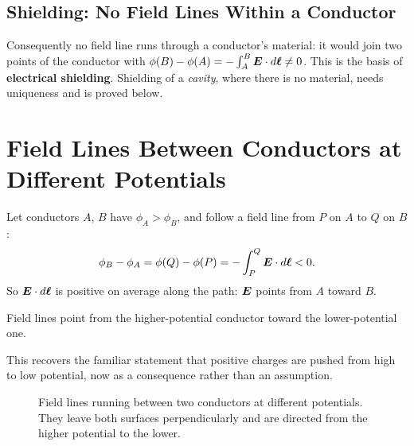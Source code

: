 \subsection{Shielding: No Field Lines Within a Conductor}
\label{sec:em-shielding}

Consequently no field line runs through a conductor's material: it would join two points of the conductor with $\phi(B)-\phi(A) = -\int_A^B\vect{E}\cdot d\vect{\ell}\neq 0$. This is the basis of \textbf{electrical shielding}. Shielding of a \emph{cavity}, where there is no material, needs uniqueness and is proved below.

\section{Field Lines Between Conductors at Different Potentials}

Let conductors $A$, $B$ have $\phi_A>\phi_B$, and follow a field line from $P$ on $A$ to $Q$ on $B$:
\[
    \phi_B - \phi_A = \phi(Q) - \phi(P) = -\int_P^Q \vect{E}\cdot d\vect{\ell} < 0 .
\]
So $\vect{E}\cdot d\vect{\ell}$ is positive on average along the path: $\vect{E}$ points from $A$ toward $B$.

\begin{fact}
Field lines point from the higher-potential conductor toward the lower-potential one.
\end{fact}

This recovers the familiar statement that positive charges are pushed from high to low potential, now as a consequence rather than an assumption.

\begin{figure}[H]
\begin{center}
\end{center}
\caption{Field lines running between two conductors at different potentials. They leave both surfaces perpendicularly and are directed from the higher potential to the lower.}
\end{figure}

